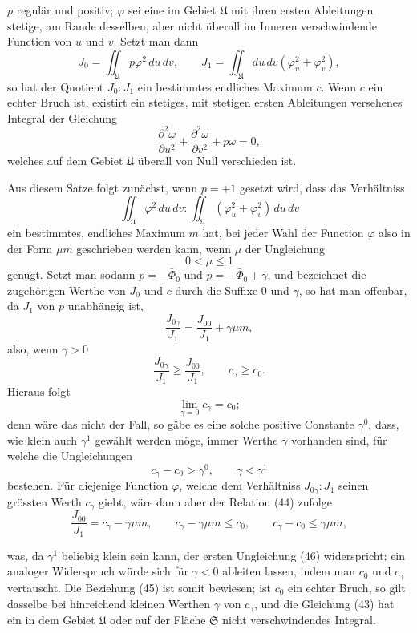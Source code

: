 \documentclass[11pt,a4paper,leqno]{article}
\begin{document}
$p$ regulär und positiv; $\varphi$ sei eine im Gebiet $\mathfrak{U}$ mit
ihren ersten Ableitungen stetige, am Rande desselben, aber nicht überall im
Inneren verschwindende Function von $u$ und $v$. Setzt man dann
\[
J_0=\iint_{\mathfrak{U}}p\varphi^2\,du\,dv,\qquad
J_1=\iint_{\mathfrak{U}}du\,dv(\varphi_u^2+\varphi_v^2),
\]
so hat der Quotient $J_0:J_1$ ein bestimmtes endliches Maximum $c$. Wenn $c$
ein echter Bruch ist, existirt ein stetiges, mit stetigen ersten Ableitungen
versehenes Integral der Gleichung
\[
\frac{\partial^2\omega}{\partial u^2}
+\frac{\partial^2\omega}{\partial v^2}+p\omega=0,
\]
welches auf dem Gebiet $\mathfrak{U}$ überall von Null verschieden ist.

Aus diesem Satze folgt zunächst, wenn $p=+1$ gesetzt wird, dass das
Verhältniss
\[
\iint_{\mathfrak{U}}\varphi^2\,du\,dv:
\iint_{\mathfrak{U}}(\varphi_u^2+\varphi_v^2)\,du\,dv
\]
ein bestimmtes, endliches Maximum $m$ hat, bei jeder Wahl der Function
$\varphi$ also in der Form $\mu m$ geschrieben werden kann, wenn $\mu$ der
Ungleichung
\[
0<\mu\leq 1
\]
genügt. Setzt man sodann $p=-\bar\Phi_0$ und
$p=-\bar\Phi_0+\gamma$, und bezeichnet die zugehörigen Werthe von $J_0$ und
$c$ durch die Suffixe 0 und $\gamma$, so hat man offenbar, da $J_1$ von $p$
unabhängig ist,
\begin{equation}\tag{44}
\frac{J_{0\gamma}}{J_1}=\frac{J_{00}}{J_1}+\gamma\mu m,
\end{equation}
also, wenn $\gamma>0$
\[
\frac{J_{0\gamma}}{J_1}\geq\frac{J_{00}}{J_1},\qquad
c_\gamma\geq c_0.
\]
Hieraus folgt
\begin{equation}\tag{45}
\lim_{\gamma=0}c_\gamma=c_0;
\end{equation}
denn wäre das nicht der Fall, so gäbe es eine solche positive Constante
$\gamma^0$, dass, wie klein auch $\gamma^1$ gewählt werden möge, immer
Werthe $\gamma$ vorhanden sind, für welche die Ungleichungen
\begin{equation}\tag{46}
c_\gamma-c_0>\gamma^0,\qquad \gamma<\gamma^1
\end{equation}
bestehen. Für diejenige Function $\varphi$, welche dem Verhältniss
$J_{0\gamma}:J_1$ seinen grössten Werth $c_\gamma$ giebt, wäre dann aber der
Relation (44) zufolge
\[
\frac{J_{00}}{J_1}=c_\gamma-\gamma\mu m,\qquad
c_\gamma-\gamma\mu m\leq c_0,\qquad
c_\gamma-c_0\leq\gamma\mu m,
\]

was, da $\gamma^1$ beliebig klein sein kann, der ersten Ungleichung (46)
widerspricht; ein analoger Widerspruch würde sich für $\gamma<0$ ableiten
lassen, indem man $c_0$ und $c_\gamma$ vertauscht. Die Beziehung (45) ist
somit bewiesen; ist $c_0$ ein echter Bruch, so gilt dasselbe bei hinreichend
kleinen Werthen $\gamma$ von $c_\gamma$, und die Gleichung (43) hat ein in dem
Gebiet $\mathfrak{U}$ oder auf der Fläche $\mathfrak{S}$ nicht
verschwindendes Integral.
\end{document}
